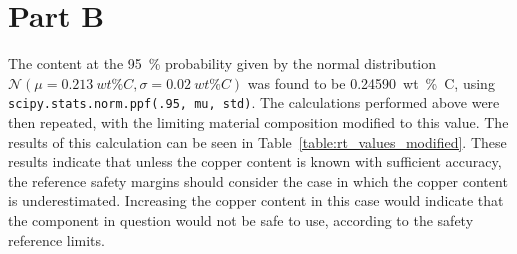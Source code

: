 \documentclass{article}
\begin{document}
\section{Part B}
    
    The  content at the \SI{95}{\percent} probability given by the normal distribution $\mathcal{N}(\mu=\SI{0.213}{wt\percent C}, \sigma=\SI{0.02}{wt\percent C})$ was found to be \SI{0.24590}{wt\percent C}, using \texttt{scipy.stats.norm.ppf(.95, mu, std)}. The calculations performed above were then repeated, with the limiting material composition modified to this value. The results of this calculation can be seen in Table~\ref{table:rt_values_modified}. These results indicate that unless the copper content is known with sufficient accuracy, the reference safety margins should consider the case in which the copper content is underestimated. Increasing the copper content in this case would indicate that the component in question would not be safe to use, according to the safety reference limits.
    
\end{document}

